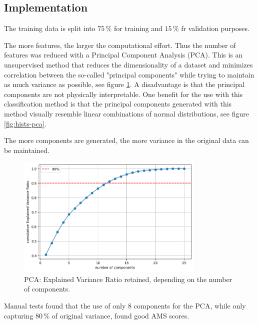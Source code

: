 \subsection{Implementation}

The training data is split into $75\,\%$ for training and $15\,\%$ fr validation purposes.


The more features, the larger the computational effort. Thus the number of features was reduced with a Principal Component Analysis (PCA). This is an unsupervised method that reduces the dimensionality of a dataset and minimizes correlation between the so-called "principal components" while trying to maintain as much variance as possible, see figure \ref{fig:pca-evr}. A disadvantage is that the principal components are not physically interpretable. One benefit for the use with this classification method is that the principal components generated with this method visually resemble linear combinations of normal distributions, see figure \ref{fig:hists-pca}. 

The more components are generated, the more variance in the original data can be maintained.

\begin{figure}
    \centering
    \includegraphics[width=0.8\textwidth]{img/Pasted image 20240805114251.png}
    \caption{PCA: Explained Variance Ratio retained, depending on the number of components.}
    \label{fig:pca-evr}
\end{figure}

Manual tests found that the use of only 8 components for the PCA, while only capturing $80\,\%$ of original variance, found good AMS scores. 



